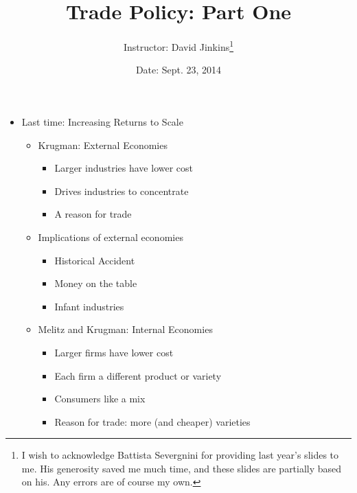 \documentclass{beamer}
\title{Trade Policy: Part One}
\author{Instructor: David Jinkins\thanks{I wish to acknowledge Battista Severgnini for providing last year's slides to me. His generosity saved me much time, and these slides are partially based on his. Any errors are of course my own.}}
\date{Date: Sept. 23, 2014}
\begin{document}
\frame{\titlepage}

\begin{frame}
    \begin{itemize}
    \itemsep1pt\parskip0pt
    \item
      Last time: Increasing Returns to Scale
      \begin{itemize}
            \item Krugman: External Economies 
            \begin{itemize}
                \item Larger industries have lower cost
                \item Drives industries to concentrate
                \item A reason for trade
            \end{itemize}
            \item Implications of external economies 
            \begin{itemize}
                \item Historical Accident
                \item Money on the table
                \item Infant industries
            \end{itemize}
            \item Melitz and Krugman: Internal Economies
            \begin{itemize}
                \item Larger firms have lower cost 
                \item Each firm a different product or variety
                \item Consumers like a mix
                \item Reason for trade: more (and cheaper) varieties
            \end{itemize}
        \end{itemize}
    \end{itemize}
\end{frame}

\end{document}
